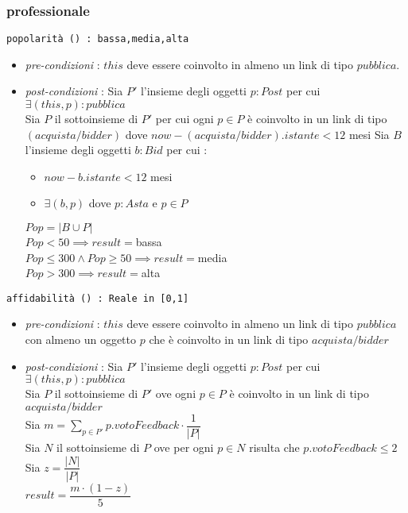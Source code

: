 \documentclass[12pt, letterpaper]{article}
\newcommand{\code}[1]{\colorbox{light-gray}{\texttt{#1}}}
\begin{document}
\subsubsection{professionale}
\code{popolarità () : {bassa,media,alta}}\begin{itemize}
    \item \textit{pre-condizioni} : $this$ deve essere coinvolto in almeno un link di tipo $pubblica$.
    \item \textit{post-condizioni} : Sia $P'$ l'insieme degli oggetti $p:Post$ per cui $\exists (this,p):pubblica$\\
            Sia $P$ il sottoinsieme di $P'$ per cui ogni $p\in P$ è coinvolto in un link di tipo $(acquista/bidder)$ dove 
            $now -(acquista/bidder).istante < 12$ mesi 
            Sia $B$ l'insieme degli oggetti $b:Bid$ per cui : \begin{itemize}
                \item $now - b.istante < 12$ mesi 
                \item $\exists (b,p)$ dove $p:Asta$ e $p\in P$
            \end{itemize}
            $Pop = |B\cup P|$\\
            $Pop<50\implies result = $bassa \\
            $Pop\le300\land Pop\ge50\implies result = $media\\ 
            $Pop>300\implies result =$alta
\end{itemize}
\code{affidabilità () : Reale in [0,1]}\begin{itemize}
    \item \textit{pre-condizioni} : $this$ deve essere coinvolto in almeno un link di tipo $pubblica$ con almeno un oggetto $p$ 
    che è coinvolto in un link di tipo $acquista/bidder$
    \item \textit{post-condizioni} : Sia $P'$ l'insieme degli oggetti $p:Post$ per cui $\exists (this,p):pubblica$\\
    Sia $P$ il sottoinsieme di $P'$ ove ogni $p\in P$ è coinvolto in un link di tipo $acquista/bidder$\\
    Sia $m=\displaystyle\sum_{p\in P'}p.votoFeedback\cdot \dfrac{1}{|P|}$\\
    Sia $N$ il sottoinsieme di $P$ ove per ogni $p\in N$ risulta che $p.votoFeedback\le 2$\\
    Sia $z=\dfrac{|N|}{|P|}$\\
    $result = \dfrac{m\cdot(1- z)}{5}$
\end{itemize}
\newpage
\end{document}

